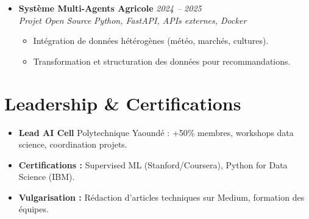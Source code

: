 \documentclass[a4paper,11pt]{article}
\begin{document}
\begin{itemize}[leftmargin=*, label={-}]
\item \textbf{Système Multi-Agents Agricole} \hfill \textit{2024 -- 2025} \\
\textit{Projet Open Source} \hfill \textit{Python, FastAPI, APIs externes, Docker}
\vspace{-2pt}
    \begin{itemize}[leftmargin=0.4cm, nosep, label=\tiny$\bullet$]
        \item \small{Intégration de données hétérogènes (météo, marchés, cultures).}
        \item \small{Transformation et structuration des données pour recommandations.}
    \end{itemize}
\vspace{3pt}

\end{itemize}

\section{Leadership \& Certifications}
\begin{itemize}[leftmargin=*, label=\tiny$\bullet$, nosep]
    \item \small{\textbf{Lead AI Cell} Polytechnique Yaoundé : +50\% membres, workshops data science, coordination projets.}
    \item \small{\textbf{Certifications :} Supervised ML (Stanford/Coursera), Python for Data Science (IBM).}
    \item \small{\textbf{Vulgarisation :} Rédaction d'articles techniques sur Medium, formation des équipes.}
\end{itemize}
\end{document}
